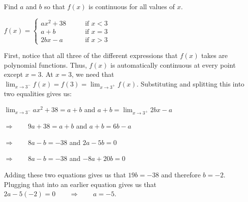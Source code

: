\documentclass[nooutcomes]{ximera}
\begin{document}
\begin{problem}
Find $a$ and $b$ so that $f(x)$ is continuous for all values of $x$.
	
	$f(x) =   \left\{ \begin{array}{ll}
	ax^2 + 38		 	&	\qquad \text{if } x < 3	\\
	a + b 				&	\qquad \text{if } x = 3	\\
	2bx - a			&	\qquad \text{if } x > 3	\end{array} \right.  $

	\begin{freeResponse}
	
	First, notice that all three of the different expressions that $f(x)$ takes are polynomial functions.  Thus, $f(x)$ is automatically continuous at every point except $x = 3$.  At $x = 3$, we need that $\lim_{x \to 3^-} f(x) = f(3) = \lim_{x \to 3^+} f(x)$.  Substituting and splitting this into two equalities gives us:
	
	$\lim_{x \to 3^-} ax^2 + 38 = a + b$ \qquad and \qquad $a + b = \lim_{x \to 3^+} 2bx-a$
	
	$ \Longrightarrow \qquad 9a + 38 = a + b$ \qquad and \qquad $a + b = 6b - a$
	
	$ \Longrightarrow \qquad 8a - b = -38$ \qquad and \qquad $2a - 5b = 0$
	
	$ \Longrightarrow \qquad 8a - b = -38$ \qquad and \qquad $-8a + 20b = 0$
	
	Adding these two equations gives us that $19b = -38$ and therefore $b = -2$.  Plugging that into an earlier equation gives us that $2a - 5(-2) = 0 \qquad \Longrightarrow \qquad a = -5$.  
	
	\end{freeResponse}
\end{problem}
	
	
	
	
	
	
	
	
	
\end{document}
